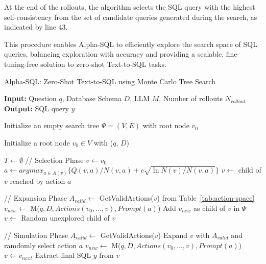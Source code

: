 At the end of the rollouts, the algorithm selects the SQL query with the highest self-consistency from the set of candidate queries generated during the search, as indicated by line 43.

This procedure enables Alpha-SQL to efficiently explore the search space of SQL queries, balancing exploration with accuracy and providing a scalable, fine-tuning-free solution to zero-shot Text-to-SQL tasks.


\begin{algorithm}
\label{algo:method}
    \caption{Alpha-SQL: Zero-Shot Text-to-SQL using Monte Carlo Tree Search}
    \label{alg:alpha-sql}
\begin{algorithmic}[1]
    
\STATE \textbf{Input:} Question $q$, Database Schema $D$, LLM $M$, Number of rollouts $N_{rollout}$
\STATE \textbf{Output:} SQL query $y$

\STATE Initialize an empty search tree $\Psi = (V, E)$ with root node $v_0$

\STATE Initialize a root node $v_0 \in V$ with ($q$, $D$)

\STATE $T \gets \emptyset$
    \STATE // Selection Phase
    \STATE $v \gets v_0$ 
        \STATE $a \gets argmax_{a \in A(v)} \{Q(v,a)/N(v,a) + c\sqrt{\ln N(v)/N(v,a)}\}$ 
        \STATE $v \gets$ child of $v$ reached by action $a$
    \ENDWHILE

    \STATE // Expansion Phase
        \STATE $A_{valid} \gets$ GetValidActions($v$) from Table~\ref{tab:action-space}
                \STATE $v_{new} \gets$ M($q, D, Actions(v_0,\dots,v), Prompt(a)$)
                \STATE Add $v_{new}$ as child of $v$ in $\Psi$
            \ENDFOR
        \ENDFOR
        \STATE $v \gets$ Random unexplored child of $v$
    \ENDIF

    \STATE // Simulation Phase
        \STATE $A_{valid} \gets$ GetValidActions($v$)
        \STATE Expand $v$ with $A_{valid}$ and ramdomly select action $a$
        \STATE $v_{new} \gets$ M($q, D, Actions(v_0,\dots,v), Prompt(a)$)
        \STATE $v \gets v_{next}$
    \ENDWHILE
    \STATE Extract final SQL $y$ from $v$


\end{algorithmic}
\end{algorithm}
